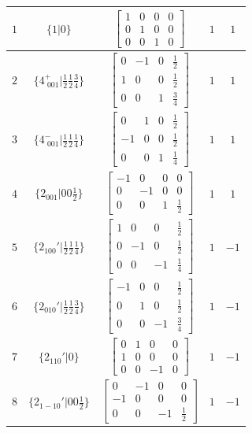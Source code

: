 \documentclass[fleqn,8pt]{jsarticle}
\begin{document}
\begin{longtable}{ccccc}
$ 1 $ & $ \{1|0\} $ & $ \begin{bmatrix} 1 & 0 & 0 & 0 \\ 0 & 1 & 0 & 0 \\ 0 & 0 & 1 & 0 \end{bmatrix} $ & $ 1 $ & $ 1 $ \\ \hline
$ 2 $ & $ \{4^{+}_{\,\,001}|\frac{1}{2} \frac{1}{2} \frac{3}{4}\} $ & $ \begin{bmatrix} 0 & -1 & 0 & \frac{1}{2} \\ 1 & 0 & 0 & \frac{1}{2} \\ 0 & 0 & 1 & \frac{3}{4} \end{bmatrix} $ & $ 1 $ & $ 1 $ \\ \hline
$ 3 $ & $ \{4^{-}_{\,\,001}|\frac{1}{2} \frac{1}{2} \frac{1}{4}\} $ & $ \begin{bmatrix} 0 & 1 & 0 & \frac{1}{2} \\ -1 & 0 & 0 & \frac{1}{2} \\ 0 & 0 & 1 & \frac{1}{4} \end{bmatrix} $ & $ 1 $ & $ 1 $ \\ \hline
$ 4 $ & $ \{2{}_{001}|0 0 \frac{1}{2}\} $ & $ \begin{bmatrix} -1 & 0 & 0 & 0 \\ 0 & -1 & 0 & 0 \\ 0 & 0 & 1 & \frac{1}{2} \end{bmatrix} $ & $ 1 $ & $ 1 $ \\ \hline
$ 5 $ & $ \{2{}_{100}{}'|\frac{1}{2} \frac{1}{2} \frac{1}{4}\} $ & $ \begin{bmatrix} 1 & 0 & 0 & \frac{1}{2} \\ 0 & -1 & 0 & \frac{1}{2} \\ 0 & 0 & -1 & \frac{1}{4} \end{bmatrix} $ & $ 1 $ & $ -1 $ \\ \hline
$ 6 $ & $ \{2{}_{010}{}'|\frac{1}{2} \frac{1}{2} \frac{3}{4}\} $ & $ \begin{bmatrix} -1 & 0 & 0 & \frac{1}{2} \\ 0 & 1 & 0 & \frac{1}{2} \\ 0 & 0 & -1 & \frac{3}{4} \end{bmatrix} $ & $ 1 $ & $ -1 $ \\ \hline
$ 7 $ & $ \{2{}_{110}{}'|0\} $ & $ \begin{bmatrix} 0 & 1 & 0 & 0 \\ 1 & 0 & 0 & 0 \\ 0 & 0 & -1 & 0 \end{bmatrix} $ & $ 1 $ & $ -1 $ \\ \hline
$ 8 $ & $ \{2{}_{1-10}{}'|0 0 \frac{1}{2}\} $ & $ \begin{bmatrix} 0 & -1 & 0 & 0 \\ -1 & 0 & 0 & 0 \\ 0 & 0 & -1 & \frac{1}{2} \end{bmatrix} $ & $ 1 $ & $ -1 $ \\
\end{longtable}
\end{document}
